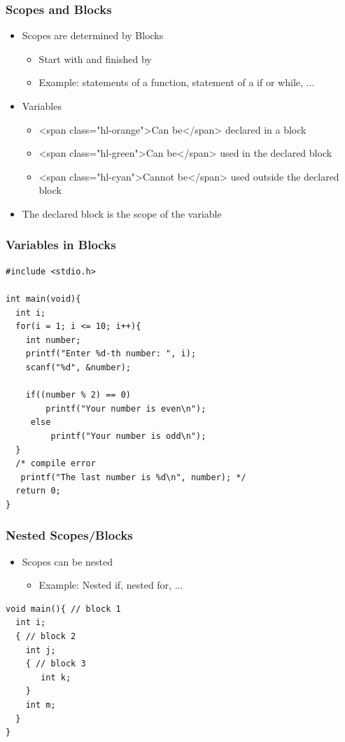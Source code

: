 \documentclass{../c-lecture}
\begin{document}
\begin{frame}
  \frametitle{Scopes and Blocks}
  \begin{itemize}
    \item Scopes are determined by Blocks
    \begin{itemize}
      \item Start with { and finished by }
      \item
        Example: statements of a function, statement of a if or while, ...

    \end{itemize}
    \item Variables
    \begin{itemize}
      \item <span class="hl-orange">Can be</span> declared in a block
      \item <span class="hl-green">Can be</span> used in the declared block
      \item
        <span class="hl-cyan">Cannot be</span> used outside the declared block

    \end{itemize}
    \item The declared block is the scope of the variable
  \end{itemize}
\end{frame}

\begin{frame}[fragile]
  \frametitle{Variables in Blocks}
  \begin{verbatim}
#include <stdio.h>

int main(void){
  int i;
  for(i = 1; i <= 10; i++){
    int number;
    printf("Enter %d-th number: ", i);
    scanf("%d", &number);

    if((number % 2) == 0)
        printf("Your number is even\n");
     else
         printf("Your number is odd\n");
  }
  /* compile error
   printf("The last number is %d\n", number); */
  return 0;
}
  \end{verbatim}
\end{frame}

\begin{frame}[fragile]
  \frametitle{Nested Scopes/Blocks}
  \begin{itemize}
    \item Scopes can be nested
    \begin{itemize}
      \item Example: Nested if, nested for, ...
    \end{itemize}
  \end{itemize}
  \begin{verbatim}
void main(){ // block 1
  int i;
  { // block 2
    int j;
    { // block 3
       int k;
    }
    int m;
  }
}
  \end{verbatim}
\end{frame}
\end{document}
